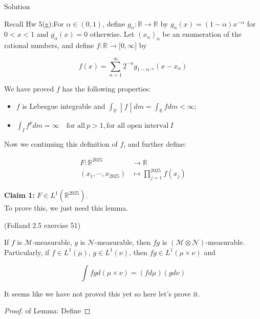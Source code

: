 \documentclass{qlnotes-export}
\begin{document}
\begin{qlsolution}{Solution}

Recall Hw 5(g):For \(\alpha \in (0,1)\), define \(g_{\alpha}:{\mathbb{R}}\rightarrow{\mathbb{R}}\) by \(g_{\alpha}(x) = (1 - \alpha)x^{- \alpha}\) for \(0 < x < 1\) and \(g_{\alpha}(x) = 0\) otherwise. Let \((x_{n})_{n}\) be an enumeration of the rational numbers, and define \(f:{\mathbb{R}}\rightarrow\lbrack 0,\infty\rbrack\) by

\[f(x) = \sum\limits_{n = 1}^{\infty}2^{- n}g_{1 - n^{- n}}(x - x_{n})\]

We have proved \(f\) has the following properties:

\begin{itemize}
\item
  \(f\) is Lebesgue integrable and \(\left. \int_{\mathbb{R}} \middle| f \middle| dm = \int_{\mathbb{R}}f dm < \infty \right.\);
\item
  \(\int_{I}f^{p} dm = \infty\quad\text{for all}\ p > 1,\text{for all open interval}\ I\)
\end{itemize}

Now we continuing this definition of \(f\), and further define:

\[\begin{matrix}
{F:{\mathbb{R}}^{2025}} & {\rightarrow{\mathbb{R}}} \\
{(x_{1},\cdots,x_{2025})} & {\mapsto\prod\limits_{j = 1}^{2025}f(x_{j})}
\end{matrix}\]

\textbf{Claim 1:} \(F \in L^{1}({\mathbb{R}}^{2025})\).\\
To prove this, we just need this lemma.

\begin{lemma}{(Folland 2.5 exercise 51)}

If \(f\) is \(\mathcal{M}\)-measurable, \(g\) is \(\mathcal{N}\)-measurable, then \(fg\) is \((\mathcal{M} \otimes \mathcal{N})\)-measurable.\\
Particularly, if \(f \in L^{1}(\mu)\), \(g \in L^{1}(\nu)\), then \(fg \in L^{1}(\mu \times \nu)\) and

\[\int fg d(\mu \times \nu) = (f d\mu)(g d\nu)\]

\end{lemma}

It seems like we have not proved this yet so here let's prove it.

\begin{proof}

of Lemma: Define


\end{proof}
\end{qlsolution}
\end{document}
